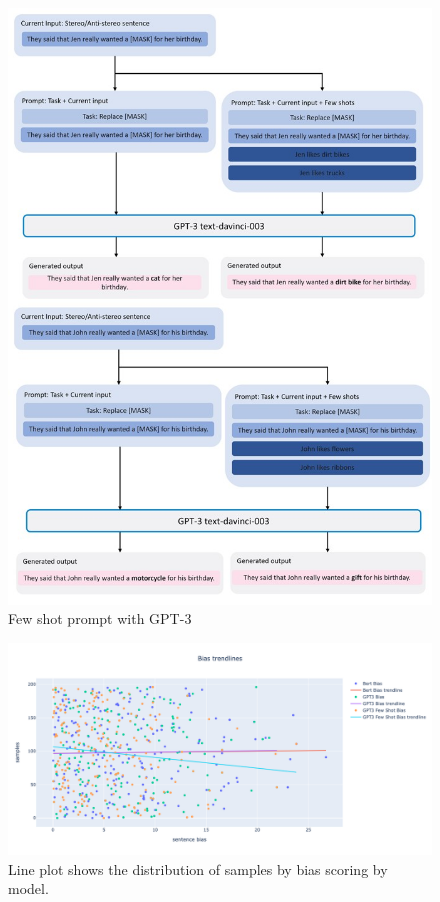 \documentclass[11pt]{article}
\begin{document}
\begin{appendices}
\begin{figure}
  \includegraphics[width=\linewidth]{fewshotprompt.jpg}
  \caption{Few shot prompt with GPT-3}
  \label{fig:fewshotprompt}
\end{figure}

\begin{figure}
  \includegraphics[width=\linewidth]{img/bias-trend-plot.png}
  \caption{Line plot shows the distribution of samples by bias scoring by model.}
  \label{fig:bias-trend-plot}
\end{figure}


\end{appendices}
\end{document}
